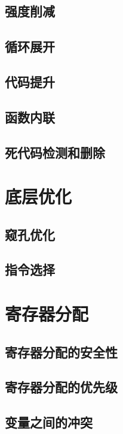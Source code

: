 \documentclass[cn,11pt,chinese]{elegantbook}
\begin{document}
\subsection{强度削减}

\subsection{循环展开}

\subsection{代码提升}

\subsection{函数内联}

\subsection{死代码检测和删除}

\section{底层优化}

\subsection{窥孔优化}

\subsection{指令选择}

\section{寄存器分配}

\subsection{寄存器分配的安全性}

\subsection{寄存器分配的优先级}

\subsection{变量之间的冲突}
\end{document}
